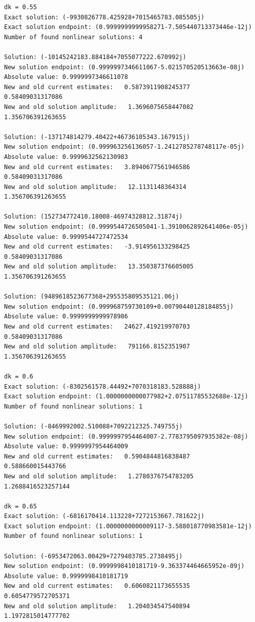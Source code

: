 \documentclass{article}
\begin{document}
\begin{verbatim}
dk = 0.55
Exact solution: (-9930826778.425928+7015465783.085505j)
Exact solution endpoint: (0.9999999999958271-7.505440713373446e-12j)
Number of found nonlinear solutions: 4

Solution: (-10145242183.884184+7055077222.670992j)
New solution endpoint: (0.9999997346611067-5.021570520513663e-08j) Absolute value: 0.9999997346611078
New and old current estimates:   0.5873911908245377    0.58409031317086
New and old solution amplitude:   1.3696075658447082    1.356706391263655

Solution: (-137174814279.40422+46736105343.167915j)
New solution endpoint: (0.999963256136057-1.2412785278748117e-05j) Absolute value: 0.9999632562130983
New and old current estimates:   3.8940677561946586    0.58409031317086
New and old solution amplitude:   12.1131148364314    1.356706391263655

Solution: (152734772410.18008-46974328812.31874j)
New solution endpoint: (0.9999544726505041-1.3910062892641406e-05j) Absolute value: 0.9999544727472534
New and old current estimates:   -3.914956133298425    0.58409031317086
New and old solution amplitude:   13.350387376605005    1.356706391263655

Solution: (9489618523677368+295535809535121.06j)
New solution endpoint: (0.999968759730109+0.00790440128184855j) Absolute value: 0.9999999999978986
New and old current estimates:   24627.419219970703    0.58409031317086
New and old solution amplitude:   791166.8152351907    1.356706391263655

dk = 0.6
Exact solution: (-8302561578.44492+7070318183.528888j)
Exact solution endpoint: (1.0000000000077982+2.07511785532688e-12j)
Number of found nonlinear solutions: 1

Solution: (-8469992002.510088+7092212325.749755j)
New solution endpoint: (0.9999997954464007-2.7783795097935382e-08j) Absolute value: 0.9999997954464009
New and old current estimates:   0.5904844816838487    0.588660015443766
New and old solution amplitude:   1.2780376754783205    1.2688416523257144

dk = 0.65
Exact solution: (-6816170414.113228+7272153667.781622j)
Exact solution endpoint: (1.0000000000009117-3.588018770983581e-12j)
Number of found nonlinear solutions: 1

Solution: (-6953472063.00429+7279403785.2738495j)
New solution endpoint: (0.9999998410181719-9.363374464665952e-09j) Absolute value: 0.9999998410181719
New and old current estimates:   0.6060821173655535    0.6054779572705371
New and old solution amplitude:   1.204034547540894    1.1972815014777702


\end{verbatim}
\end{document}
